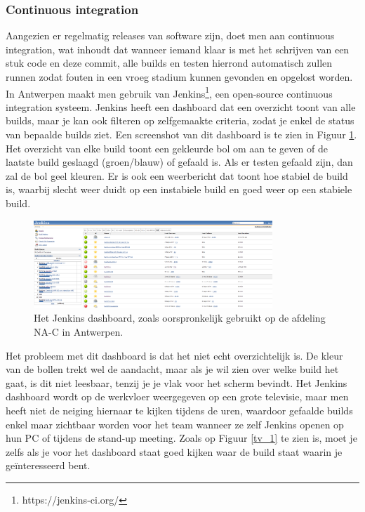 \documentclass[10pt,a4paper]{article}
\begin{document}
\subsubsection{Continuous integration}
Aangezien er regelmatig releases van software zijn, doet men aan continuous integration, wat inhoudt dat wanneer iemand klaar is met het schrijven van een stuk code en deze commit, alle builds en testen hierrond automatisch zullen runnen zodat fouten in een vroeg stadium kunnen gevonden en opgelost worden.\\
In Antwerpen maakt men gebruik van Jenkins\footnote{https://jenkins-ci.org/}, een open-source continuous integration systeem. Jenkins heeft een dashboard dat een overzicht toont van alle builds, maar je kan ook filteren op zelfgemaakte criteria, zodat je enkel de status van bepaalde builds ziet. Een screenshot van dit dashboard is te zien in Figuur \ref{jenkins}. Het overzicht van elke build toont een gekleurde bol om aan te geven of de laatste build geslaagd (groen/blauw) of gefaald is. Als er testen gefaald zijn, dan zal de bol geel kleuren.
Er is ook een weerbericht dat toont hoe stabiel de build is, waarbij slecht weer duidt op een instabiele build en goed weer op een stabiele build. 

\begin{figure}[ht!]
\centering
\includegraphics[width=90mm]{CaptureJenkins.png}
\caption{Het Jenkins dashboard, zoals oorspronkelijk gebruikt op de afdeling NA-C in Antwerpen.} 
\label{jenkins}
\end{figure}

Het probleem met dit dashboard is dat het niet echt overzichtelijk is. De kleur van de bollen trekt wel de aandacht, maar als je wil zien over welke build het gaat, is dit niet leesbaar, tenzij je je vlak voor het scherm bevindt. Het Jenkins dashboard wordt op de werkvloer weergegeven op een grote televisie, maar men heeft niet de neiging hiernaar te kijken tijdens de uren, waardoor gefaalde builds enkel maar zichtbaar worden voor het team wanneer ze zelf Jenkins openen op hun PC of tijdens de stand-up meeting. Zoals op Figuur \ref{tv_1} te zien is, moet je zelfs als je voor het dashboard staat goed kijken waar de build staat waarin je ge\"interesseerd bent.
\end{document}
